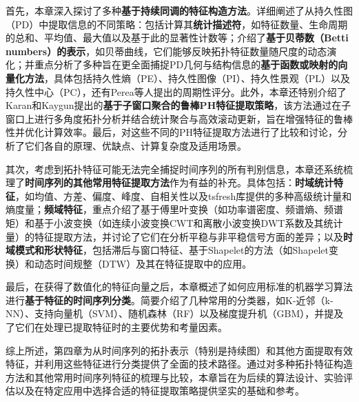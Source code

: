首先，本章深入探讨了多种\textbf{基于持续同调的特征构造方法}。详细阐述了从持久性图（PD）中提取信息的不同策略：包括计算其\textbf{统计描述符}，如特征数量、生命周期的总和、平均值、最大值以及基于此的显著性计数等\cite{mittal2017topological}；介绍了\textbf{基于贝蒂数（Betti numbers）的表示}，如贝蒂曲线，它们能够反映拓扑特征数量随尺度的动态演化\cite{umeda2019topological}；并重点分析了多种旨在更全面捕捉PD几何与结构信息的\textbf{基于函数或映射的向量化方法}，具体包括持久性熵（PE）\cite{atienza2020stability, atienza2018stability}、持久性图像（PI）\cite{adams2017persistence}、持久性景观（PL）\cite{1}以及持久性中心（PC）\cite{JSJC202406009}，还有Perea等人提出的周期性评分。此外，本章还特别介绍了Karan和Kaygun提出的\textbf{基于子窗口聚合的鲁棒PH特征提取策略}\cite{3}，该方法通过在子窗口上进行多角度拓扑分析并结合统计聚合与高效滚动更新，旨在增强特征的鲁棒性并优化计算效率。最后，对这些不同的PH特征提取方法进行了比较和讨论，分析了它们各自的原理、优缺点、计算复杂度及适用场景。

其次，考虑到拓扑特征可能无法完全捕捉时间序列的所有判别信息，本章还系统梳理了\textbf{时间序列的其他常用特征提取方法}作为有益的补充。具体包括：\textbf{时域统计特征}，如均值、方差、偏度、峰度、自相关性以及tsfresh库\cite{christ2018time}提供的多种高级统计量和熵度量；\textbf{频域特征}，重点介绍了基于傅里叶变换（如功率谱密度、频谱熵、频谱矩）和基于小波变换（如连续小波变换CWT和离散小波变换DWT系数及其统计量）的特征提取方法\cite{yi2023survey, rhif2019wavelet}，并讨论了它们在分析平稳与非平稳信号方面的差异；以及\textbf{时域模式和形状特征}，包括滞后与窗口特征、基于Shapelet的方法（如Shapelet变换）和动态时间规整（DTW）及其在特征提取中的应用。

最后，在获得了数值化的特征向量之后，本章概述了如何应用标准的机器学习算法进行\textbf{基于特征的时间序列分类}。简要介绍了几种常用的分类器，如K-近邻（k-NN）、支持向量机（SVM）、随机森林（RF）以及梯度提升机（GBM），并提及了它们在处理已提取特征时的主要优势和考量因素。

综上所述，第四章为从时间序列的拓扑表示（特别是持续图）和其他方面提取有效特征，并利用这些特征进行分类提供了全面的技术路径。通过对多种拓扑特征构造方法和其他常用时间序列特征的梳理与比较，本章旨在为后续的算法设计、实验评估以及在特定应用中选择合适的特征提取策略提供坚实的基础和参考。